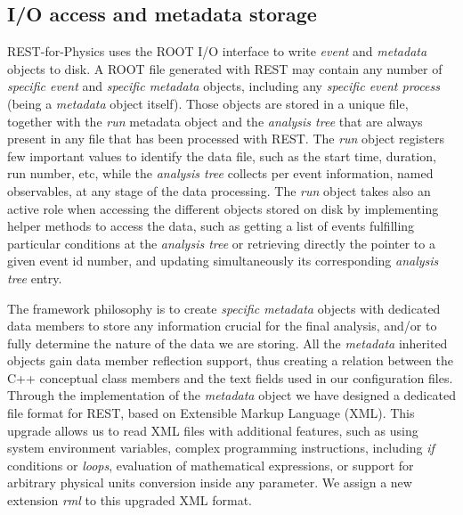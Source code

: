 



\subsection{I/O access and metadata storage}



REST-for-Physics uses the ROOT I/O interface to write \emph{event} and \emph{metadata} objects to disk. A ROOT file generated with REST may contain any number of \emph{specific event} and \emph{specific metadata} objects, including any \emph{specific event process} (being a \emph{metadata} object itself). Those objects are stored in a unique file, together with the \emph{run} metadata object and the \emph{analysis tree} that are always present in any file that has been processed with REST. The \emph{run} object registers few important values to identify the data file, such as the start time, duration, run number, etc, while the \emph{analysis tree} collects per event information, named observables, at any stage of the data processing. The \emph{run} object takes also an active role when accessing the different objects stored on disk by implementing helper methods to access the data, such as getting a list of events fulfilling particular conditions at the \emph{analysis tree} or retrieving directly the pointer to a given event id number, and updating simultaneously its corresponding \emph{analysis tree} entry.

The framework philosophy is to create \emph{specific metadata} objects with dedicated data members to store any information crucial for the final analysis, and/or to fully determine the nature of the data we are storing. All the \emph{metadata} inherited objects gain data member reflection support, thus creating a relation between the C++ conceptual class members and the text fields used in our configuration files. Through the implementation of the \emph{metadata} object we have designed a dedicated file format for REST, based on Extensible Markup Language (XML). This upgrade allows us to read XML files with additional features, such as using system environment variables, complex programming instructions, including \emph{if} conditions or \emph{loops}, evaluation of mathematical expressions, or support for arbitrary physical units conversion inside any parameter. We assign a new extension \emph{rml} to this upgraded XML format.

